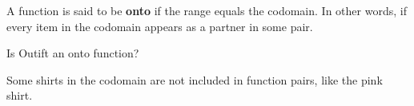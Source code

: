 \documentclass{ximera}
\begin{document}
\begin{definition}
  A function is said to be \textbf{onto} if the range equals the codomain. In other words, if every item in the codomain appears as a partner in some pair.   
  
\end{definition}



\begin{exercise}
 Is Outift an onto function?
  \begin{multipleChoice}
  \end{multipleChoice}
  \begin{feedback}
Some shirts in the codomain are not included in function pairs, like the pink shirt.
  \end{feedback}
\end{exercise}
\end{document}
